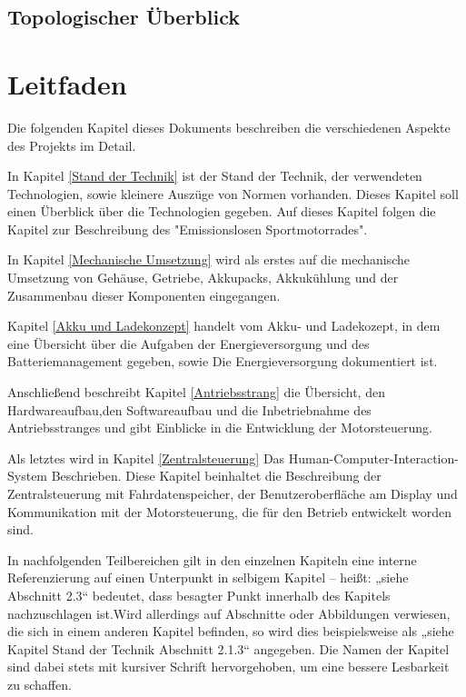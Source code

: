 \subsection{Topologischer Überblick}

\newpage

\section{Leitfaden}

Die folgenden Kapitel dieses Dokuments beschreiben die verschiedenen Aspekte des Projekts im Detail. 

In Kapitel \ref{Stand der Technik} ist der Stand der Technik, der verwendeten Technologien, sowie kleinere Auszüge von Normen vorhanden. Dieses Kapitel soll einen Überblick über die Technologien gegeben. Auf dieses Kapitel folgen die Kapitel zur Beschreibung des "Emissionslosen Sportmotorrades". 

In Kapitel \ref{Mechanische Umsetzung} wird als erstes auf die mechanische Umsetzung von Gehäuse, Getriebe, Akkupacks, Akkukühlung und der Zusammenbau dieser Komponenten eingegangen. 

Kapitel \ref{Akku und Ladekonzept} handelt vom Akku- und Ladekozept, in dem eine Übersicht über die Aufgaben der Energieversorgung und des Batteriemanagement gegeben, sowie Die Energieversorgung dokumentiert ist. 

Anschließend beschreibt Kapitel \ref{Antriebsstrang} die Übersicht, den Hardwareaufbau,den Softwareaufbau und die Inbetriebnahme des Antriebsstranges und gibt Einblicke in die Entwicklung der Motorsteuerung. 

Als letztes wird in Kapitel \ref{Zentralsteuerung} Das Human-Computer-Interaction-System Beschrieben. Diese Kapitel beinhaltet die Beschreibung der Zentralsteuerung mit Fahrdatenspeicher, der Benutzeroberfläche am Display und Kommunikation mit der Motorsteuerung, die für den Betrieb entwickelt worden sind.

In nachfolgenden Teilbereichen gilt in den einzelnen Kapiteln eine interne Referenzierung auf einen Unterpunkt in selbigem Kapitel – heißt: „siehe Abschnitt 2.3“ bedeutet, dass besagter Punkt innerhalb des Kapitels nachzuschlagen ist.Wird allerdings auf Abschnitte oder Abbildungen verwiesen, die sich in einem anderen Kapitel befinden, so wird dies beispielsweise als „siehe Kapitel Stand der Technik Abschnitt 2.1.3“ angegeben. Die Namen der Kapitel sind dabei stets mit kursiver Schrift hervorgehoben, um eine bessere Lesbarkeit zu schaffen.